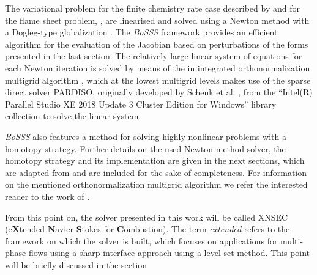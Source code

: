 The variational problem for the finite chemistry rate case described by  and for the flame sheet problem, , are linearised and solved using a Newton method with a Dogleg-type globalization \cite{pawlowskiGlobalizationTechniquesNewton2006,pawlowskiInexactNewtonDogleg2008}. The \textit{BoSSS} framework provides an efficient algorithm for the evaluation of the Jacobian based on perturbations of the forms presented in the last section.
The relatively large linear system of equations for each Newton iteration is solved by means of the in \BoSSS integrated orthonormalization multigrid algorithm \cite{kummerBoSSSPackageMultigrid2021}, which at the lowest multigrid levels makes use of the sparse direct solver PARDISO, originally developed by Schenk et al. \cite{schenkEfficientSparseLU2000,schenkTwolevelDynamicScheduling2002,schenkSolvingUnsymmetricSparse2004a},
from the ``Intel(R) Parallel Studio XE 2018 Update 3 Cluster Edition for Windows'' library collection to solve the linear system.

\textit{BoSSS} also features a method for solving highly nonlinear problems with a homotopy strategy.
Further details on the used Newton method solver, the homotopy strategy and its implementation are given in the next sections, which are adapted from \cite{kikkerFullyCoupledHighorder}  and are included for the sake of completeness. For information on the mentioned orthonormalization multigrid algorithm we refer the interested reader to the work of \cite{kummerBoSSSPackageMultigrid2021}.

From this point on, the solver presented in this work will be called XNSEC (e\textbf{X}tended \textbf{N}avier-\textbf{S}tokes for \textbf{C}ombustion). The term \textit{extended} refers to the framework on which the solver is built, which focuses on applications for multi-phase flows using a sharp interface approach using a level-set method. This point will be briefly discussed in the section %

